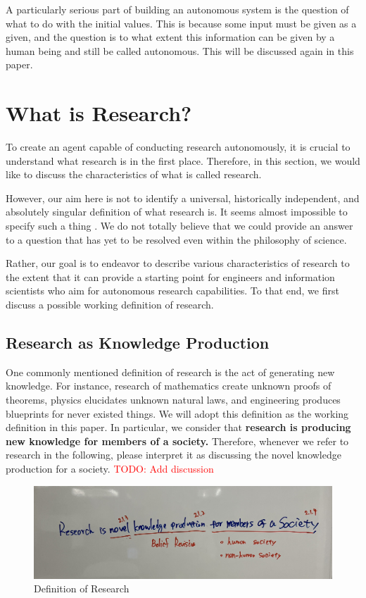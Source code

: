 A particularly serious part of building an autonomous system is the question of what to do with the initial values. This is because some input must be given as a given, and the question is to what extent this information can be given by a human being and still be called autonomous. This will be discussed again in this paper.

\section{What is Research?}
To create an agent capable of conducting research autonomously, it is crucial to understand what research is in the first place. Therefore, in this section, we would like to discuss the characteristics of what is called research.

However, our aim here is not to identify a universal, historically independent, and absolutely singular definition of what research is. It seems almost impossible to specify such a thing \cite{chalmers2013thing,sep-scientific-method}. We do not totally believe that we could provide an answer to a question that has yet to be resolved even within the philosophy of science.

Rather, our goal is to endeavor to describe various characteristics of research to the extent that it can provide a starting point for engineers and information scientists who aim for autonomous research capabilities. To that end, we first discuss a possible working definition of research.

\subsection{Research as Knowledge Production}

One commonly mentioned definition of research is the act of generating new knowledge. For instance, research of mathematics create unknown proofs of theorems, physics elucidates unknown natural laws, and engineering produces blueprints for never existed things. We will adopt this definition as the working definition in this paper. In particular, we consider that \textbf{research is producing new knowledge for members of a society.} Therefore, whenever we refer to research in the following, please interpret it as discussing the novel knowledge production for a society. \textcolor{red}{TODO: Add discussion}

\begin{figure}[htb]
    \centering
    \includegraphics[width=\linewidth]{figs/definition.jpg}
    \caption{Definition of Research}
    \label{fig:definition}
\end{figure}

